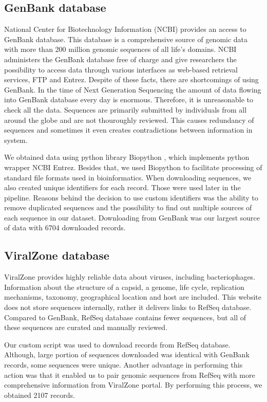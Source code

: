 \subsection{GenBank database}
National Center for Biotechnology Information (NCBI) provides an access to GenBank\cite{genbank} database.
This database is a comprehensive source of genomic data with more than 200 million genomic sequences of all life’s domains.
NCBI administers the GenBank database free of charge and give researchers the possibility to access data through various interfaces as web-based retrieval services, FTP and Entrez\cite{entrez}.
Despite of these facts, there are shortcomings of using GenBank.
In the time of Next Generation Sequencing the amount of data flowing into GenBank database every day is enormous.
Therefore, it is unreasonable to check all the data.
Sequences are primarily submitted by individuals from all around the globe and are not thouroughly reviewed.
This causes redundancy of sequences and sometimes it even creates contradictions between information in system.

We obtained data using python library Biopython \cite{biopython}, which implements python wrapper NCBI Entrez.
Besides that, we used Biopython to facilitate  processing of standard file formats used in bioinformatics.
When downloading sequences, we also created unique identifiers for each record.
Those were used later in the pipeline.
Reasons behind the decision to use custom identifiers was the ability to remove duplicated sequences and the possibility to find out multiple sources of each sequence in our dataset.
Downloading from GenBank was our largest source of data with 6704 downloaded records.

\subsection{ViralZone database}
ViralZone provides highly reliable data about viruses, including bacteriophages.
Information about the structure of a capsid, a genome, life cycle, replication mechanisms, taxonomy, geographical location and host are included.
This website does not store sequences internally, rather it delivers links to RefSeq\cite{refseq} database.
Compared to GenBank, RefSeq database contains fewer sequences, but all of these sequences are curated and manually reviewed.

Our custom script was used to download records from RefSeq database.
Although, large portion of sequences downloaded was identical with GenBank records, some sequences were unique.
Another advantage in performing this action was that it enabled us to pair genomic sequences from RefSeq with more comprehensive information from ViralZone portal.
By performing this process, we obtained 2107 records.

